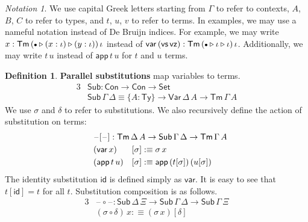 \documentclass[12pt,a4paper,twoside,openany]{book}
\theoremstyle{remark}
\newtheorem{notation}{Notation}
\theoremstyle{definition}
\newtheorem{mydefinition}{Definition}
\theoremstyle{theorem}
\newcommand{\ms}[1]{\mathsf{#1}}
\newcommand{\id}{\mathsf{id}}
\newcommand{\Con}{\mathsf{Con}}
\newcommand{\Sub}{\mathsf{Sub}}
\newcommand{\Tm}{\mathsf{Tm}}
\newcommand{\Ty}{\mathsf{Ty}}
\newcommand{\blank}{\mathord{\hspace{1pt}\text{--}\hspace{1pt}}}
\newcommand{\Set}{\mathsf{Set}}
\newcommand{\ext}{\triangleright}
\newcommand{\emptycon}{\scaleobj{.75}\bullet}
\newcommand{\Var}{\ms{Var}}
\newcommand{\var}{\ms{var}}
\newcommand{\app}{\ms{app}}
\newcommand{\vz}{\ms{vz}}
\newcommand{\vs}{\ms{vs}}
\newcommand{\defn}{:\equiv}
\begin{document}
\begin{notation} We use capital Greek letters starting from $\Gamma$ to refer to contexts, $A$, $B$, $C$ to
refer to types, and $t$, $u$, $v$ to refer to terms. In examples, we may use a
nameful notation instead of De Bruijn indices. For example, we may write $x :
\Tm\,(\emptycon \ext (x : \iota) \ext (y : \iota))\,\iota$ instead of $\var\,(\vs\,\vz)
: \Tm\,(\emptycon \ext \iota \ext \iota)\,\iota$. Additionally, we may write
$t\,u$ instead of $\app\,t\,u$ for $t$ and $u$ terms.
\end{notation}

\begin{mydefinition} \textbf{Parallel substitutions} map variables to terms.
\begin{alignat*}{3}
&\Sub : \Con \to \Con \to \Set\\
&\Sub\,\Gamma\,\Delta \equiv \{A : \Ty\} \to \Var\,\Delta\,A \to \Tm\,\Gamma\,A
\end{alignat*}
We use $\sigma$ and $\delta$ to refer to substitutions. We also recursively
define the action of substitution on terms:
\begin{alignat*}{3}
  &\rlap{$\blank[\blank] : \Tm\,\Delta\,A \to \Sub\,\Gamma\,\Delta \to \Tm\,\Gamma\,A$}\\
  &(\var\, x)   &&[ \sigma ] \defn \sigma\,x\\
  &(\app\,t\,u) &&[ \sigma ] \defn \app\,(t[\sigma])\,(u[\sigma])
\end{alignat*}
The identity substitution $\id$ is defined simply as $\var$. It is easy to see that
$t[\id] = t$ for all $t$. Substitution composition is as follows.
\begin{alignat*}{3}
  &\blank\!\circ\!\blank : \Sub\,\Delta\,\Xi \to \Sub\,\Gamma\,\Delta \to \Sub\,\Gamma\,\Xi\\
  &(\sigma \circ \delta)\,x \defn (\sigma\,x)[\delta]
\end{alignat*}
\end{mydefinition}
\end{document}
